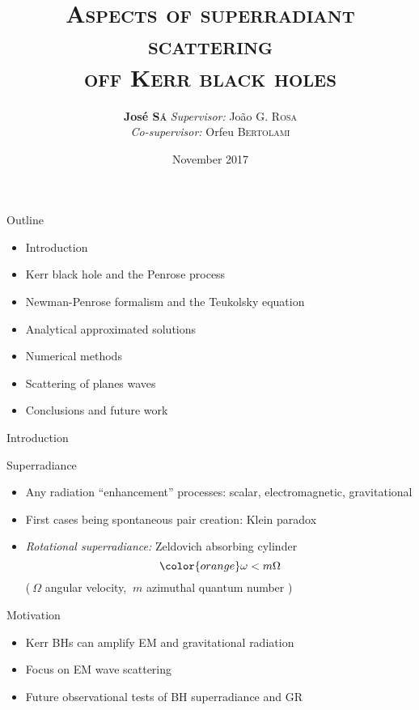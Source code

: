 \documentclass[9pt]{beamer}
\title{\scshape\huge Aspects of superradiant scattering\\off Kerr black holes}
\date{\normalsize November 2017}
\author{\large\textbf{José \textsc{Sá}} \hfill \textit{Supervisor:} João G. \textsc{Rosa} \\[0.15cm] \phantom{arg} \hfill \textit{Co-supervisor:} Orfeu \textsc{Bertolami} \\[0.4cm]}
\institute{\small Faculdade de Ciências da Universidade do Porto}
\begin{document}
\maketitle


\begin{frame}[fragile]{Outline}
    \begin{itemize}
        \large
        \setlength\itemsep{1.6em}
        \item Introduction
        \item Kerr black hole and the Penrose process
        \item Newman-Penrose formalism and the Teukolsky equation
        \item Analytical approximated solutions
        \item Numerical methods
        \item Scattering of planes waves 
        \item Conclusions and future work
    \end{itemize}
\end{frame}


\begin{frame}[fragile]{Introduction}
	\begin{block}{Superradiance}
		\begin{itemize}
			\setlength\itemsep{1em}
			
			\item Any radiation ``enhancement'' processes: scalar, electromagnetic, gravitational
			
			\item First cases being spontaneous pair creation: Klein paradox 
			
			\item \emph{Rotational superradiance:} Zeldovich absorbing cylinder 
			$$\color{orange} \omega < m \Omega $$
			{\small ($~\Omega$ angular velocity, $~m$ azimuthal quantum number )}
		\end{itemize}
	\end{block}
	\begin{block}{Motivation}
		\begin{itemize}
			\setlength\itemsep{1em}
			\item Kerr BHs can amplify EM and gravitational radiation
			\item Focus on EM wave scattering
			\item Future observational tests of BH superradiance and GR
		\end{itemize}
	\end{block}
\end{frame}
\end{document}
